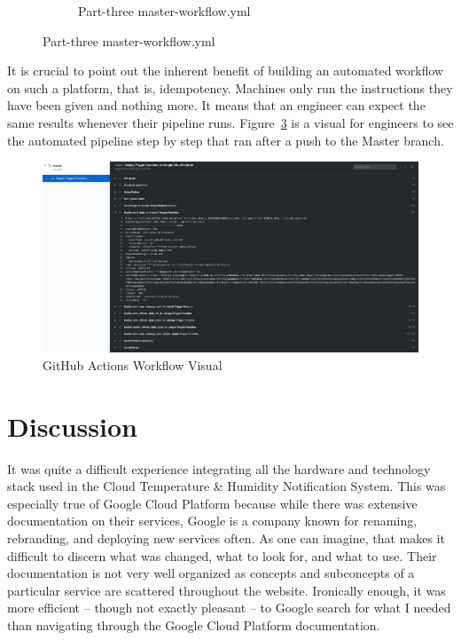\documentclass{article}
\begin{document}
\begin{figure}[H]
	\begin{figure}[H]
		
		\caption{Part-three master-workflow.yml}
		\label{fig:workflow-file-three}
	\end{figure}
\end{figure}

It is crucial to point out the inherent benefit of building an automated workflow on such a platform, that is, idempotency. Machines only run the instructions they have been given and nothing more. It means that an engineer can expect the same results whenever their pipeline runs. Figure~\ref{fig:workflow-visual} is a visual for engineers to see the automated pipeline step by step that ran after a push to the Master branch.\\

\begin{figure}[H]
	\center
	\includegraphics[width=\textwidth]{images/github-actions.png}
	\caption{GitHub Actions Workflow Visual}
	\label{fig:workflow-visual}
\end{figure}

\section{Discussion}
It was quite a difficult experience integrating all the hardware and technology stack used in the Cloud Temperature \& Humidity Notification System. This was especially true of Google Cloud Platform because while there was extensive documentation on their services, Google is a company known for renaming, rebranding, and deploying new services often. As one can imagine, that makes it difficult to discern what was changed, what to look for, and what to use. Their documentation is not very well organized as concepts and subconcepts of a particular service are scattered throughout the website. Ironically enough, it was more efficient -- though not exactly pleasant -- to Google search for what I needed than navigating through the Google Cloud Platform documentation.\\
\end{document}
